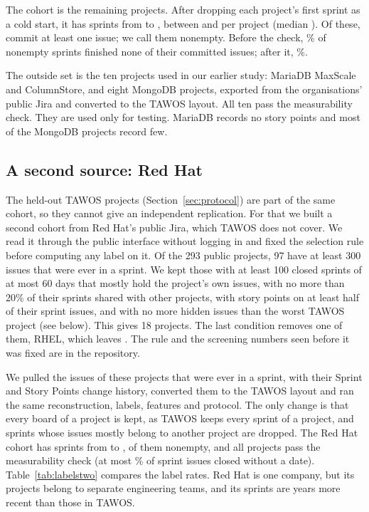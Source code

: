 The cohort is the remaining \NProj{} projects. After dropping each project's first sprint as a cold start, it has \NSprints{} sprints from \DateFrom{} to \DateTo, between \SprintMin{} and \SprintMax{} per project (median \SprintMed). Of these, \NNonempty{} commit at least one issue; we call them nonempty. Before the check, \FullNothingPct\% of nonempty sprints finished none of their committed issues; after it, \CleanNothingPct\%.

The outside set is the ten projects used in our earlier study: MariaDB MaxScale and ColumnStore, and eight MongoDB projects, exported from the organisations' public Jira and converted to the TAWOS layout. All ten pass the measurability check. They are used only for testing. MariaDB records no story points and most of the MongoDB projects record few.

\subsection{A second source: Red Hat}
\label{sec:redhat}

The \ConfProj{} held-out TAWOS projects (Section~\ref{sec:protocol}) are part of the same cohort, so they cannot give an independent replication. For that we built a second cohort from Red Hat's public Jira, which TAWOS does not cover. We read it through the public interface without logging in and fixed the selection rule before computing any label on it. Of the 293 public projects, 97 have at least 300 issues that were ever in a sprint. We kept those with at least 100 closed sprints of at most 60 days that mostly hold the project's own issues, with no more than 20\% of their sprints shared with other projects, with story points on at least half of their sprint issues, and with no more hidden issues than the worst TAWOS project (see below). This gives 18 projects. The last condition removes one of them, RHEL, which leaves \RHProj. The rule and the screening numbers seen before it was fixed are in the repository.

We pulled the \RHIssues{} issues of these projects that were ever in a sprint, with their Sprint and Story Points change history, converted them to the TAWOS layout and ran the same reconstruction, labels, features and protocol. The only change is that every board of a project is kept, as TAWOS keeps every sprint of a project, and sprints whose issues mostly belong to another project are dropped. The Red Hat cohort has \RHSprints{} sprints from \RHFrom{} to \RHTo, \RHNonempty{} of them nonempty, and all \RHProj{} projects pass the measurability check (at most \RHUnrecMax\% of sprint issues closed without a date). Table~\ref{tab:labelstwo} compares the label rates. Red Hat is one company, but its projects belong to separate engineering teams, and its sprints are years more recent than those in TAWOS.

